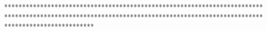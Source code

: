 











*************************************************************************************************************************************************************************
